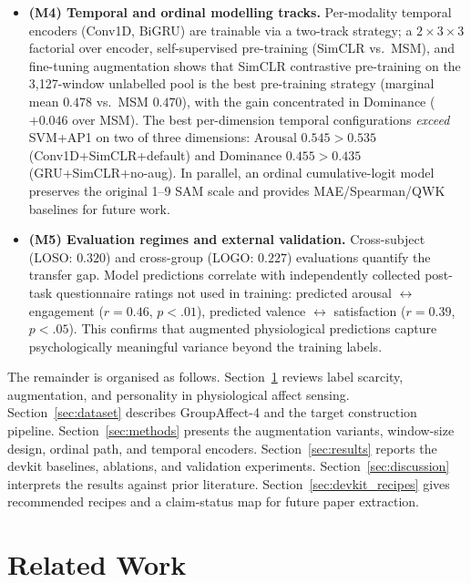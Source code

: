 \documentclass[sigconf,nonacm]{acmart}
\begin{document}
\begin{itemize}[leftmargin=1.2em,topsep=2pt,itemsep=1pt]
  \item \textbf{(M4) Temporal and ordinal modelling tracks.}
    Per-modality temporal encoders (Conv1D, BiGRU) are trainable via a
    two-track strategy; a $2{\times}3{\times}3$ factorial over encoder,
    self-supervised pre-training (SimCLR vs.\ MSM), and fine-tuning
    augmentation shows that SimCLR contrastive pre-training on the 3{,}127-window
    unlabelled pool is the best pre-training strategy (marginal mean
    $0.478$ vs.\ MSM $0.470$), with the gain concentrated in Dominance
    ($+0.046$ over MSM).
    The best per-dimension temporal configurations \emph{exceed} SVM+AP1 on
    two of three dimensions: Arousal $0.545 > 0.535$ (Conv1D+SimCLR+default)
    and Dominance $0.455 > 0.435$ (GRU+SimCLR+no-aug).
    In parallel, an ordinal cumulative-logit model preserves the original
    1--9 SAM scale and provides MAE/Spearman/QWK baselines for future work.

  \item \textbf{(M5) Evaluation regimes and external validation.}
    Cross-subject (LOSO: $0.320$) and cross-group (LOGO: $0.227$)
    evaluations quantify the transfer gap.
    Model predictions correlate with independently collected post-task
    questionnaire ratings not used in training:
    predicted arousal $\leftrightarrow$ engagement ($r{=}0.46$, $p{<}.01$),
    predicted valence $\leftrightarrow$ satisfaction ($r{=}0.39$, $p{<}.05$).
    This confirms that augmented physiological predictions capture
    psychologically meaningful variance beyond the training labels.

\end{itemize}

The remainder is organised as follows.
Section~\ref{sec:related} reviews label scarcity, augmentation, and
personality in physiological affect sensing.
Section~\ref{sec:dataset} describes GroupAffect-4 and the target
construction pipeline.
Section~\ref{sec:methods} presents the augmentation variants, window-size
design, ordinal path, and temporal encoders.
Section~\ref{sec:results} reports the devkit baselines, ablations, and
validation experiments.
Section~\ref{sec:discussion} interprets the results against prior literature.
Section~\ref{sec:devkit_recipes} gives recommended recipes and a claim-status
map for future paper extraction.

\section{Related Work}
\label{sec:related}
\end{document}
